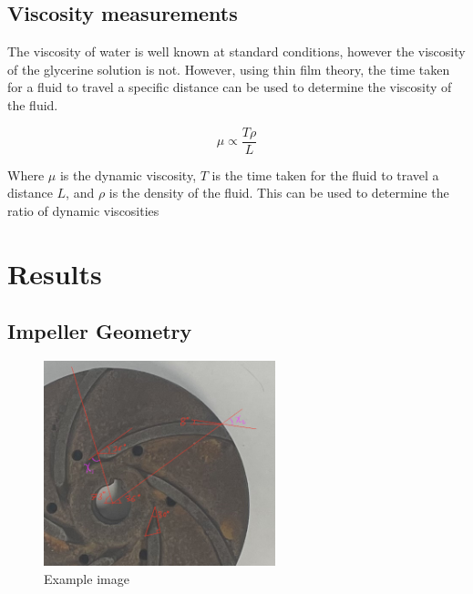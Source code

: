\documentclass{article}
\begin{document}
\subsection{Viscosity measurements}

The viscosity of water is well known at standard conditions, however the viscosity of the glycerine solution is not.
However, using thin film theory, the time taken for a fluid to travel a specific distance can be used to determine the viscosity of the fluid.

\begin{equation}
    \mu \propto \frac{T\rho}{L}
\end{equation}
    
Where $\mu$ is the dynamic viscosity, $T$ is the time taken for the fluid to travel a distance $L$, and $\rho$ is the density of the fluid.
This can be used to determine the ratio of dynamic viscosities
\section{Results}


\subsection{Impeller Geometry}

\begin{figure}[H]
    \centering
    \includegraphics[width=0.6\textwidth]{impeller_annotations.png}
    \caption{Example image}
    \label{fig:impeller_annotations}
\end{figure}
\end{document}
